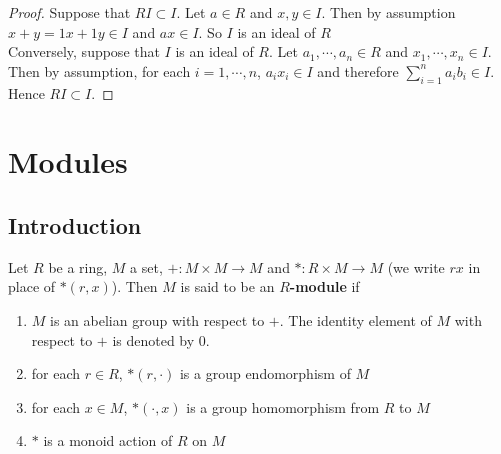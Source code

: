 \documentclass{book}
\begin{document}
	\begin{proof}
		Suppose that $RI \subset I$. Let $a \in R$ and $x,y \in I$. Then by assumption $x + y = 1x + 1y \in I$ and $ax \in I$. So $I$ is an ideal of $R$\\
		Conversely, suppose that $I$ is an ideal of $R$. Let $a_1, \cdots, a_n \in R$ and $x_1, \cdots, x_n \in I$. Then by assumption, for each $i = 1, \cdots, n$, $a_ix_i \in I$ and therefore $\sum\limits_{i=1}^n a_ib_i \in I$. Hence $RI \subset I$.
	\end{proof}
	
	
	
	
	
	
	
	
	
	
	
	
	
	
	
	
	
	
	
	
	
	
	
	
	
	
	
	
	
	
	
	
	
	
	
	
	
	
	
	
	
	
	
	
	
	
	
	
	
	
	
	
	
	
	
	
	
	
	
	
	
	
	
	
	
	\newpage	
	\chapter{Modules}
	
	\section{Introduction}
	
	\begin{defn}
		Let $R$ be a ring, $M$ a set, $+: M\times M \rightarrow M$ and $*: R 
		\times M \rightarrow M$ (we write $rx$ in place of 
		$*(r,x)$). Then $M$ is said to be an 
		\textbf{$R$-module}
		if 
		\begin{enumerate}
			\item $M$ is an abelian group with respect to $+$. The identity element of $M$ with respect to $+$ is denoted by 0.
			\item for each $r \in R$, $*(r, \cdot)$ is a group endomorphism of $M$
			\item for each $x \in M$, $*(\cdot, x)$ is a group homomorphism from $R$ to $M$
			\item $*$ is a monoid action of $R$ on $M$
		\end{enumerate}
	\end{defn}
	
\end{document}
